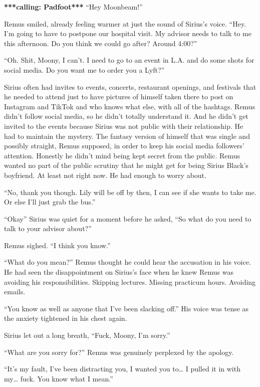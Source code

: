 \documentclass[12pt,twoside,openright]{memoir}
\begin{document}
\textbf{***calling: Padfoot***}\newline
``Hey Moonbeam!''

Remus smiled, already feeling warmer at just the sound of Sirius's voice. ``Hey. I'm going to have to postpone our hospital visit. My advisor needs to talk to me this afternoon. Do you think we could go after? Around 4:00?''

``Oh. Shit, Moony, I can't. I need to go to an event in L.A. and do some shots for social media. Do you want me to order you a Lyft?'' 

Sirius often had invites to events, concerts, restaurant openings, and festivals that he needed to attend just to have pictures of himself taken there to post on Instagram and TikTok and who knows what else, with all of the hashtags. Remus didn't follow social media, so he didn't totally understand it. And he didn't get invited to the events because Sirius was not public with their relationship. He had to maintain the mystery. The fantasy version of himself that was single and possibly straight, Remus supposed, in order to keep his social media followers' attention. Honestly he didn't mind being kept secret from the public. Remus wanted no part of the public scrutiny that he might get for being Sirius Black's boyfriend. At least not right now. He had enough to worry about. 

``No, thank you though. Lily will be off by then, I can see if she wants to take me. Or else I'll just grab the bus.''

``Okay'' Sirius was quiet for a moment before he asked, ``So what do you need to talk to your advisor about?''

Remus sighed. ``I think you know.''

``What do you mean?'' Remus thought he could hear the accusation in his voice. He had seen the disappointment on Sirius's face when he knew Remus was avoiding his responsibilities. Skipping lectures. Missing practicum hours. Avoiding emails.

``You know as well as anyone that I've been slacking off.'' His voice was tense as the anxiety tightened in his chest again.

Sirius let out a long breath, ``Fuck, Moony, I'm sorry.''

``What are you sorry for?'' Remus was genuinely perplexed by the apology.

``It's my fault, I've been distracting you, I wanted you to… I pulled it in with my… fuck. You know what I mean.''
\end{document}
